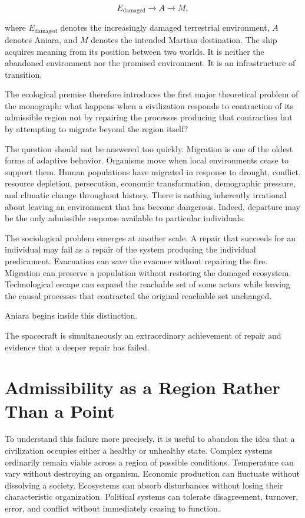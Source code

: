 \documentclass[11pt,oneside]{book}
\theoremstyle{definition}
\theoremstyle{remark}
\begin{document}
\[
E_{\mathrm{damaged}}
\longrightarrow
A
\longrightarrow
M,
\]

where \(E_{\mathrm{damaged}}\) denotes the increasingly damaged terrestrial environment, \(A\) denotes Aniara, and \(M\) denotes the intended Martian destination. The ship acquires meaning from its position between two worlds. It is neither the abandoned environment nor the promised environment. It is an infrastructure of transition.

The ecological premise therefore introduces the first major theoretical problem of the monograph: what happens when a civilization responds to contraction of its admissible region not by repairing the processes producing that contraction but by attempting to migrate beyond the region itself?

The question should not be answered too quickly. Migration is one of the oldest forms of adaptive behavior. Organisms move when local environments cease to support them. Human populations have migrated in response to drought, conflict, resource depletion, persecution, economic transformation, demographic pressure, and climatic change throughout history. There is nothing inherently irrational about leaving an environment that has become dangerous. Indeed, departure may be the only admissible response available to particular individuals.

The sociological problem emerges at another scale. A repair that succeeds for an individual may fail as a repair of the system producing the individual predicament. Evacuation can save the evacuee without repairing the fire. Migration can preserve a population without restoring the damaged ecosystem. Technological escape can expand the reachable set of some actors while leaving the causal processes that contracted the original reachable set unchanged.

Aniara begins inside this distinction.

The spacecraft is simultaneously an extraordinary achievement of repair and evidence that a deeper repair has failed.

\section{Admissibility as a Region Rather Than a Point}

To understand this failure more precisely, it is useful to abandon the idea that a civilization occupies either a healthy or unhealthy state. Complex systems ordinarily remain viable across a region of possible conditions. Temperature can vary without destroying an organism. Economic production can fluctuate without dissolving a society. Ecosystems can absorb disturbances without losing their characteristic organization. Political systems can tolerate disagreement, turnover, error, and conflict without immediately ceasing to function.
\end{document}
